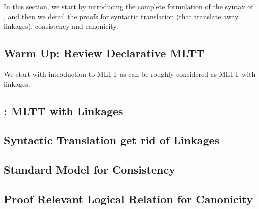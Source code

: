 In this section, we start by introducing the complete formulation of the syntax of \TT, 
and then we detail the proofs for syntactic translation (that translate away linkages), 
consistency and canonicity.

\subsection{Warm Up: Review Declarative MLTT}
We start with introduction to MLTT as \TT can be roughly considered as MLTT with linkages.



\subsection{\TT : MLTT with Linkages}








\subsection{Syntactic Translation get rid of Linkages}



\subsection{Standard Model for Consistency}




\subsection{Proof Relevant Logical Relation for Canonicity}

